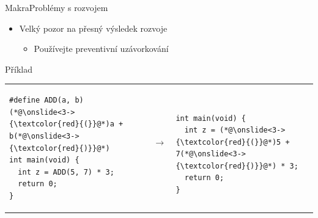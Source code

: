 \begin{frame}[fragile]{Makra}{Problémy s rozvojem}

  \begin{itemize}
    \item Velký pozor na přesný výsledek rozvoje
    \begin{itemize}
      \item Používejte preventivní uzávorkování
    \end{itemize}
  \end{itemize}

\begin{block}{Příklad}
\begin{tabular}{lll}

\pause

\begin{lstlisting}
#define ADD(a, b) (*@\onslide<3->{\textcolor{red}{(}}@*)a + b(*@\onslide<3->{\textcolor{red}{)}}@*)
int main(void) {
  int z = ADD(5, 7) * 3;
  return 0;
}
\end{lstlisting}
& $\rightarrow$~ &
\begin{lstlisting}

int main(void) {
  int z = (*@\onslide<3->{\textcolor{red}{(}}@*)5 + 7(*@\onslide<3->{\textcolor{red}{)}}@*) * 3;
  return 0;
}
\end{lstlisting}
\end{tabular}
\end{block}

\end{frame}

